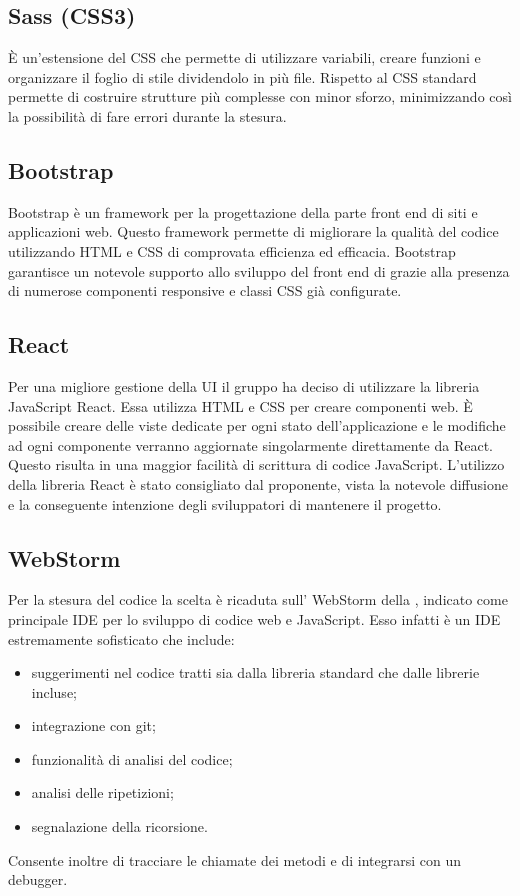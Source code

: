 \subsection{Sass (CSS3)}
È un'estensione del CSS che permette di utilizzare variabili, creare funzioni e organizzare il foglio di stile dividendolo in più file. Rispetto al CSS standard permette di costruire strutture più complesse con minor sforzo, minimizzando così la possibilità di fare errori durante la stesura.

\subsection{Bootstrap}
Bootstrap è un framework per la progettazione della parte front end di siti e applicazioni web. Questo framework permette di migliorare la qualità del codice utilizzando  HTML e CSS di comprovata efficienza ed efficacia. Bootstrap garantisce un notevole supporto allo sviluppo del front end di \ProjectName{} grazie alla presenza di numerose componenti responsive e classi CSS già configurate.

\subsection{React}
Per una migliore gestione della UI il gruppo ha deciso di utilizzare la libreria JavaScript React. Essa utilizza HTML e CSS per creare componenti web. È possibile creare delle viste dedicate per ogni stato dell'applicazione e le modifiche ad ogni componente verranno aggiornate singolarmente direttamente da React. Questo risulta in una maggior facilità di scrittura di codice JavaScript. L'utilizzo della libreria React è stato consigliato dal proponente, vista la notevole diffusione e la conseguente intenzione degli sviluppatori di mantenere il progetto.

\subsection{WebStorm}
Per la stesura del codice la scelta è ricaduta sull' WebStorm della , indicato come principale IDE per lo sviluppo di codice web e JavaScript. Esso infatti è un IDE estremamente sofisticato che include:
\begin{itemize}
	\item suggerimenti nel codice tratti sia dalla libreria standard che dalle librerie incluse;
	\item integrazione con git;
	\item funzionalità di analisi del codice;
	\item analisi delle ripetizioni;
	\item segnalazione della ricorsione.
\end{itemize}
Consente inoltre di tracciare le chiamate dei metodi e di integrarsi con un debugger.
